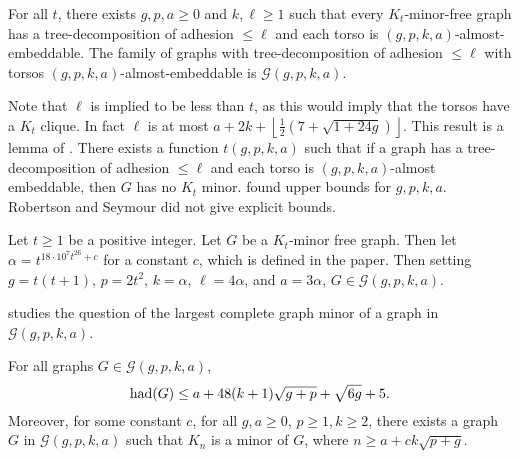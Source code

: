 \begin{theorem}\label{thm:gmst}
	For all \(t\), there exists \(g, p, a \geq 0\) and \(k, \ell \geq 1\) such that every \(K_t\)-minor-free graph has a tree-decomposition of adhesion \(\leq \ell\) and each torso is \((g, p, k, a)\)-almost-embeddable. The  family of graphs with tree-decomposition of adhesion $\leq \ell$ with torsos $(g, p, k, a)$-almost-embeddable is \(\mathcal{G}(g, p, k, a)\). 
\end{theorem}
Note that $\ell$ is implied to be less than $t$, as this would imply that the torsos have a $K_t$ clique. In fact $\ell$ is at most $a + 2k + \left\lfloor 
\frac{1}{2} (7 + \sqrt{1 + 24g})
\right\rfloor$. This result is a lemma of \textcite{dujmovicLayeredSeparatorsMinorclosed2017}. 
There exists a function \(t(g, p, k, a)\) such that if a graph has a tree-decomposition of adhesion \(\leq \ell\) and each torso is \((g, p, k, a)\)-almost embeddable, then \(G\) has no \(K_t\) minor. \textcite{kawarabayashiQuicklyExcludingNonplanar2021} found upper bounds for $g, p, k, a$. Robertson and Seymour did not give explicit bounds.

\begin{theorem}
	Let $t \geq 1$ be a positive integer. Let $G$ be a $K_t$-minor free graph. Then let $\alpha = t^{18 \cdot 10^{7} t^{26} + c}$ for a constant $c$, which is defined in the paper. Then setting $g = t(t+1)$, $p = 2t^2$, $k = \alpha$, $\ell = 4\alpha$, and $a = 3\alpha$, $G \in \mathcal{G}(g,p,k,a)$. 
\end{theorem}

\textcite{joretCompleteGraphMinors2013} studies the question of the largest complete graph minor of a graph in $\mathcal{G}(g, p, k, a)$. 

\begin{theorem}\label{thm:graph_structure_bound_theorem}
	For all graphs \(G \in \mathcal{G}(g, p, k, a)\),
	\[\operatorname{had}(G) \leq a + 48(k + 1)\sqrt{g + p} + \sqrt{6g} + 5.\] Moreover, for some constant $c$, for all $g, a \geq 0$, $p \geq 1, k \geq 2$, there exists a graph $G$ in \(\mathcal{G}(g, p, k, a)\) such that \(K_n\) is a minor of $G$, where \(n \geq a + c k\sqrt{p + g}\).
\end{theorem}